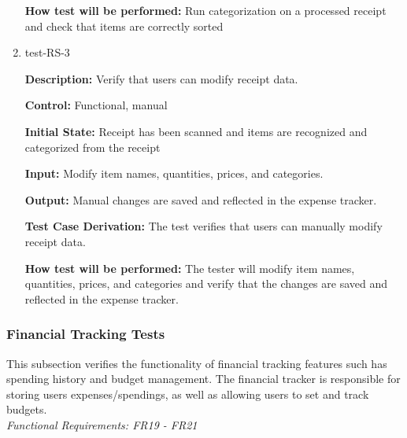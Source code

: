 \documentclass[12pt, titlepage]{article}
\begin{document}
\begin{enumerate}
\textbf{How test will be performed:} Run categorization on a processed receipt and check that items are correctly sorted


\item{test-RS-3\\}

\textbf{Description:} Verify that users can modify receipt data.

\textbf{Control:} Functional, manual

\textbf{Initial State:} Receipt has been scanned and items are recognized and
categorized from the receipt

\textbf{Input:} Modify item names, quantities, prices, and categories.

\textbf{Output:} Manual changes are saved and reflected in the expense tracker.

\textbf{Test Case Derivation:} The test verifies that users can manually modify
receipt data.

\textbf{How test will be performed:} The tester will modify item names,
quantities, prices, and categories and verify that the changes are saved and
reflected in the expense tracker.


\end{enumerate}

\subsubsection{Financial Tracking Tests}

This subsection verifies the functionality of financial tracking features such has spending history and budget management. The financial tracker is responsible for storing users expenses/spendings, as well as allowing users to set and track budgets.\\
\textit{Functional Requirements: FR19 - FR21}
\end{document}

